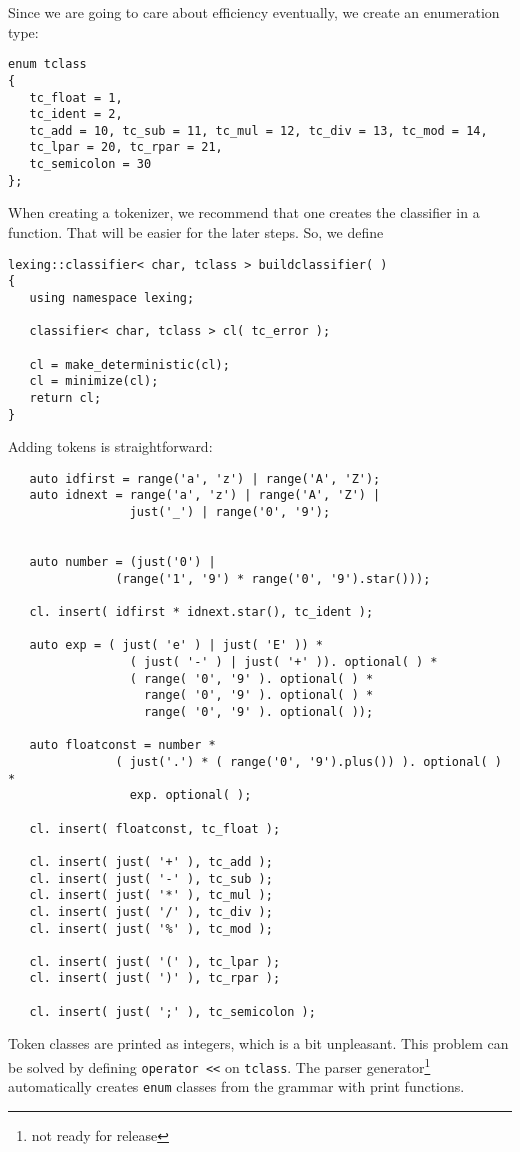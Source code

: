 \documentclass{article}
\begin{document}
Since we are going to care about efficiency eventually,
we create an enumeration type:
\begin{verbatim}
enum tclass
{
   tc_float = 1,
   tc_ident = 2,
   tc_add = 10, tc_sub = 11, tc_mul = 12, tc_div = 13, tc_mod = 14,
   tc_lpar = 20, tc_rpar = 21,
   tc_semicolon = 30
}; \end{verbatim}

\noindent
When creating a tokenizer, we recommend that one 
creates the classifier in a function. That 
will be easier for the later steps. 
So, we define
\begin{verbatim}
lexing::classifier< char, tclass > buildclassifier( )
{
   using namespace lexing;

   classifier< char, tclass > cl( tc_error );

   cl = make_deterministic(cl);
   cl = minimize(cl); 
   return cl;
} \end{verbatim}
Adding tokens is straightforward:
\begin{verbatim}
   auto idfirst = range('a', 'z') | range('A', 'Z');
   auto idnext = range('a', 'z') | range('A', 'Z') |
                 just('_') | range('0', '9');


   auto number = (just('0') |
               (range('1', '9') * range('0', '9').star()));

   cl. insert( idfirst * idnext.star(), tc_ident );

   auto exp = ( just( 'e' ) | just( 'E' )) *
                 ( just( '-' ) | just( '+' )). optional( ) *
                 ( range( '0', '9' ). optional( ) *
                   range( '0', '9' ). optional( ) *
                   range( '0', '9' ). optional( ));

   auto floatconst = number *
               ( just('.') * ( range('0', '9').plus()) ). optional( ) *
                 exp. optional( );

   cl. insert( floatconst, tc_float );

   cl. insert( just( '+' ), tc_add );
   cl. insert( just( '-' ), tc_sub );
   cl. insert( just( '*' ), tc_mul );
   cl. insert( just( '/' ), tc_div );
   cl. insert( just( '%' ), tc_mod );

   cl. insert( just( '(' ), tc_lpar );
   cl. insert( just( ')' ), tc_rpar );

   cl. insert( just( ';' ), tc_semicolon ); \end{verbatim}

   \noindent
   Token classes are printed as integers, which 
   is a bit unpleasant. 
   This problem can be solved by defining
   \verb+operator <<+ on \verb+tclass+.
   The parser generator\footnote{not ready for release} automatically creates 
   \verb+enum+ classes from the grammar with print functions.
\end{document}
